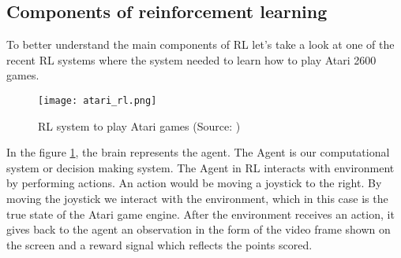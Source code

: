 

%
%
%




\subsection{Components of reinforcement learning}
To better understand the main components of RL let's take a
look at one of the recent RL systems where the system
needed to learn how to play Atari 2600 games.

\begin{figure}[H]
	\texttt{[image: atari\_rl.png]}
	\caption{
		RL system to play Atari games (Source: \cite{mnih2013playing})
		}
	\label{img:atari_rl}
\end{figure}
In the figure \ref{img:atari_rl}, the brain represents the agent. The Agent is our
computational system or decision making system.
The Agent in RL interacts with environment by performing actions. An action would be moving a joystick to the right.
By moving the joystick
we interact with the environment, which in this case is the true state of the Atari game engine.
After the environment receives an action, it gives back to the agent an observation
in the form of the video frame shown on the screen
and a reward signal which reflects the points scored.
\\
